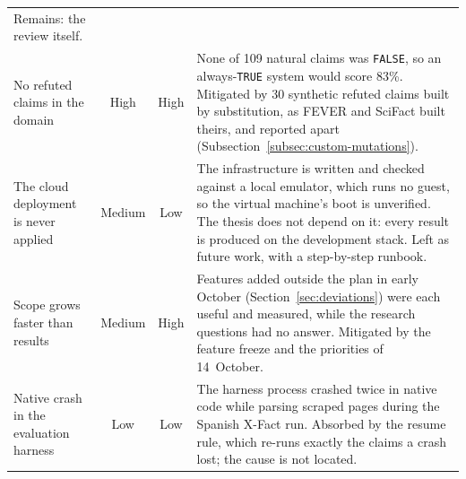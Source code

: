 {\begin{longtable}{@{}p{3.4cm}ccp{8.2cm}@{}}
Remains: the review itself. \\
\addlinespace
No refuted claims in the domain & High & High & None of 109 natural
claims was \texttt{FALSE}, so an always-\texttt{TRUE} system would
score 83\%. Mitigated by 30 synthetic refuted claims built by
substitution, as FEVER and SciFact built theirs, and reported apart
(Subsection~\ref{subsec:custom-mutations}). \\
\addlinespace
The cloud deployment is never applied & Medium & Low & The
infrastructure is written and checked against a local emulator, which
runs no guest, so the virtual machine's boot is unverified. The thesis
does not depend on it: every result is produced on the development
stack. Left as future work, with a step-by-step runbook. \\
\addlinespace
Scope grows faster than results & Medium & High & Features added
outside the plan in early October (Section~\ref{sec:deviations}) were
each useful and measured, while the research questions had no answer.
Mitigated by the feature freeze and the priorities of 14~October. \\
\addlinespace
Native crash in the evaluation harness & Low & Low & The harness
process crashed twice in native code while parsing scraped pages
during the Spanish X-Fact run. Absorbed by the resume rule, which
re-runs exactly the claims a crash lost; the cause is not located. \\
\end{longtable}
}
